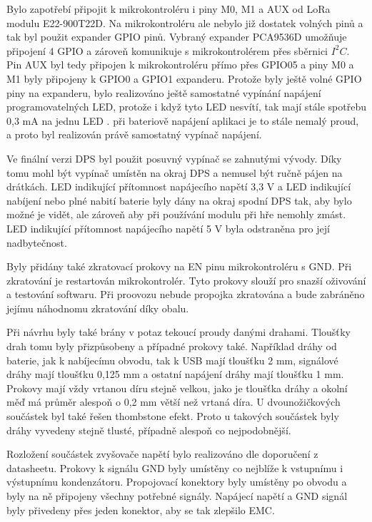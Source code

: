 Bylo zapotřebí připojit k mikrokontroléru i piny M0, M1 a AUX od LoRa modulu E22-900T22D. Na mikrokontroléru ale nebylo již dostatek volných pinů a tak byl použit expander GPIO pinů. Vybraný expander
PCA9536D umožňuje připojení 4 GPIO a zároveň komunikuje s mikrokontrolérem přes sběrnici $I^2C$. Pin AUX byl tedy připojen k mikrokontroléru přímo přes GPIO05 a piny M0 a M1 byly připojeny k GPIO0 
a GPIO1 expanderu. Protože byly ještě volné GPIO piny na expanderu, bylo realizováno ještě samostatné vypínání napájení programovatelných LED, protože i když tyto LED nesvítí, tak mají stále spotřebu 
0,3 mA na jednu LED \cite{WS2812C_dtsh}. při bateriově napájení aplikaci je to stále nemalý proud, a proto byl realizován právě samostatný vypínač napájení. 

Ve finální verzi DPS byl použit posuvný vypínač se zahnutými vývody. Díky tomu mohl být vypínač umístěn na okraj DPS a nemusel být ručně pájen na drátkách. LED indikující přítomnost napájecího napětí 
3,3 V a LED indikující nabíjení nebo plné nabití baterie byly dány na okraj spodní DPS tak, aby bylo možné je vidět, ale zároveň aby při používání modulu při hře nemohly zmást. LED indikující přítomnost 
napájecího napětí 5 V byla odstraněna pro její nadbytečnost. 

Byly přidány také zkratovací prokovy na EN pinu mikrokontroléru s GND. Při zkratování je restartován mikrokontrolér. Tyto prokovy slouží pro snazší oživování a testování softwaru. Při proovozu nebude propojka 
zkratována a bude zabráněno jejímu náhodnomu zkratování díky obalu. 

Při návrhu byly také brány v potaz tekoucí proudy danými drahami. Tloušťky drah tomu byly přizpůsobeny a případné prokovy také. Například dráhy od baterie, jak k nabíjecímu obvodu, tak k USB mají tloušťku
2 mm, signálové dráhy mají tloušťku 0,125 mm a ostatní napájení dráhy mají tloušťku 1 mm. Prokovy mají vždy vrtanou díru stejně velkou, jako je tloušťka dráhy a okolní měď má průměr alespoň o 0,2 mm větší 
než vrtaná díra. U dvounožičkových součástek byl také řešen thombstone efekt. Proto u takových součástek byly dráhy vyvedeny stejně tlusté, případně alespoň co nejpodobnější. 

Rozložení součástek zvyšovače napětí bylo realizováno dle doporučení z datasheetu. Prokovy k signálu GND byly umístěny co nejblíže k vstupnímu i výstupnímu kondenzátoru. Propojovací konektory byly 
umístěny po obvodu a byly na ně připojeny všechny potřebné signály. Napájecí napětí a GND signál byly přivedeny přes jeden konektor, aby se tak zlepšilo EMC. 


